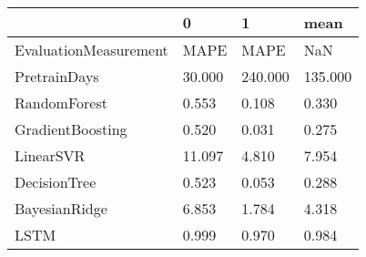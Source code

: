 \begin{tabular}{llll}
\toprule
{} &       0 &        1 &     mean \\
\midrule
EvaluationMeasurement &    MAPE &     MAPE &      NaN \\
PretrainDays          &  30.000 &  240.000 &  135.000 \\
RandomForest          &   0.553 &    0.108 &    0.330 \\
GradientBoosting      &   0.520 &    0.031 &    0.275 \\
LinearSVR             &  11.097 &    4.810 &    7.954 \\
DecisionTree          &   0.523 &    0.053 &    0.288 \\
BayesianRidge         &   6.853 &    1.784 &    4.318 \\
LSTM                  &   0.999 &    0.970 &    0.984 \\
\bottomrule
\end{tabular}

